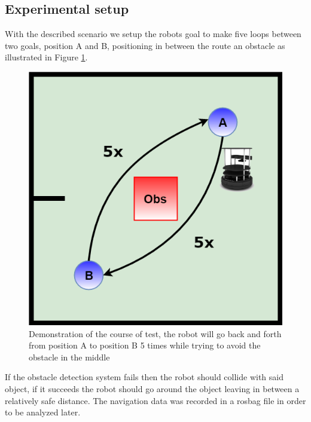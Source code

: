 \subsection{Experimental setup}
With the described scenario we setup the robots goal to make five loops between two goals, position A and B, positioning in between the route an obstacle as illustrated in  Figure \ref{fig:exp}. 
\begin{figure}[ht!]
\centerline{\includegraphics [width=0.5 \textwidth]{imgs/chapter5/exp.png}}
\caption[Demonstration of the course of test]{Demonstration of the course of test, the robot will go back and forth from position A to position B 5 times while  trying to avoid the obstacle in the middle}
\label{fig:exp}
\end{figure}

If the obstacle detection system fails then the robot should collide with said object, if it succeeds the robot should go around the object leaving in between a relatively safe distance. 
The  navigation data was recorded in a rosbag file in order to be analyzed later.

